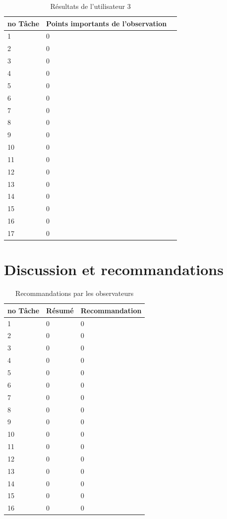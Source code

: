 \documentclass[letterpaper, oneside, 12pt, these, creativecommons]{thETS}
\begin{document}
\newpage

\begin{table}
	\centering
	\begin{tabular}{|l|l|l|}
	\hline
	no Tâche	& Points importants de l'observation	\\ \hline
	1		& 0						\\ \hline
	2		& 0						\\ \hline
	3		& 0						\\ \hline
	4		& 0						\\ \hline
	5		& 0						\\ \hline
	6		& 0						\\ \hline
	7		& 0						\\ \hline
	8		& 0						\\ \hline
	9		& 0						\\ \hline
	10		& 0						\\ \hline
	11		& 0						\\ \hline
	12		& 0						\\ \hline
	13		& 0						\\ \hline
	14		& 0						\\ \hline
	15		& 0						\\ \hline
	16		& 0						\\ \hline
	17		& 0						\\ \hline
	\end{tabular}
	\caption{Résultats de l'utilisateur 3}
\end{table}

\newpage

\section{Discussion et recommandations}

\begin{table}
	\centering
	\begin{tabular}{|l|l|l|}
	\hline
	no Tâche	& Résumé	& Recommandation 	\\ \hline
	1		& 0		& 0 			\\ \hline
	2		& 0		& 0 			\\ \hline
	3		& 0		& 0 			\\ \hline
	4		& 0		& 0 			\\ \hline
	5		& 0		& 0 			\\ \hline
	6		& 0		& 0 			\\ \hline
	7		& 0		& 0 			\\ \hline
	8		& 0		& 0 			\\ \hline
	9		& 0		& 0 			\\ \hline
	10		& 0		& 0 			\\ \hline
	11		& 0		& 0 			\\ \hline
	12		& 0		& 0 			\\ \hline
	13		& 0		& 0 			\\ \hline
	14		& 0		& 0 			\\ \hline
	15		& 0		& 0 			\\ \hline
	16		& 0		& 0 			\\ \hline
	\end{tabular}
	\caption{Recommandations par les observateurs}
\end{table}
\end{document}

